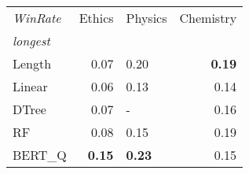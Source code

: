 \begin{tabular}{lrlr}
\toprule
\textit{WinRate} &  Ethics & Physics &  
Chemistry \\
\textit{longest}  &         &         &            \\
\midrule
Length &    0.07 &     0.20 &       \textbf{0.19} \\
Linear &    0.06 &    0.13 &       0.14 \\
DTree  &    0.07 &       - &       0.16 \\
RF     &    0.08 &    0.15 &       0.19 \\
BERT\_Q &    \textbf{0.15} &    \textbf{0.23} &       0.15 \\
\bottomrule
\end{tabular}
